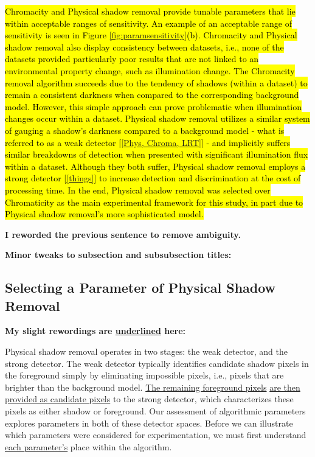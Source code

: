 \documentclass[12pt]{report}
\newcommand{\comment}[1]
           {\par {\bfseries \color{blue} #1 \par}}
\begin{document}
\hl{Chromacity and Physical shadow removal provide tunable parameters that lie within acceptable ranges of sensitivity. An example of an acceptable range of sensitivity is seen in Figure \ref{fig:paramsensitivity}(b). Chromacity and Physical shadow removal also display consistency between datasets, i.e., none of the datasets provided particularly poor results that are not linked to an environmental property change, such as illumination change. The Chromacity removal algorithm succeeds due to the tendency of shadows (within a dataset) to remain a consistent darkness when compared to the corresponding background model. However, this simple approach can prove problematic when illumination changes occur within a dataset. Physical shadow removal utilizes a similar system of gauging a shadow's darkness compared to a background model - what is referred to as a weak detector [\ref{Phys, Chroma, LRT}] - and implicitly suffers similar breakdowns of detection when presented with significant illumination flux within a dataset. Although they both suffer, Physical shadow removal employs a strong detector [\ref{things}] to increase detection and discrimination at the cost of processing time. In the end, Physical shadow removal was selected over Chromaticity as the main experimental framework for this study, in part due to Physical shadow removal's more sophisticated model.}
\comment{I reworded the previous sentence to remove ambiguity.}

\comment{Minor tweaks to subsection and subsubsection titles:}
\subsection{Selecting a Parameter of Physical Shadow Removal} \label{section:selectparameter}

\comment{My slight rewordings are \underline{underlined} here:}
Physical shadow removal operates in two stages: the weak detector, and the strong detector. The weak detector typically identifies candidate shadow pixels in the foreground simply by eliminating impossible pixels, i.e., pixels that are brighter than the background model. \underline{The remaining foreground pixels} \underline{are then provided as candidate pixels} to the strong detector, which characterizes these pixels as either shadow or foreground. Our assessment of algorithmic parameters explores parameters in both of these detector spaces. Before we can illustrate which parameters were considered for experimentation, we must first understand \underline{each parameter's} place within the algorithm.
\end{document}

